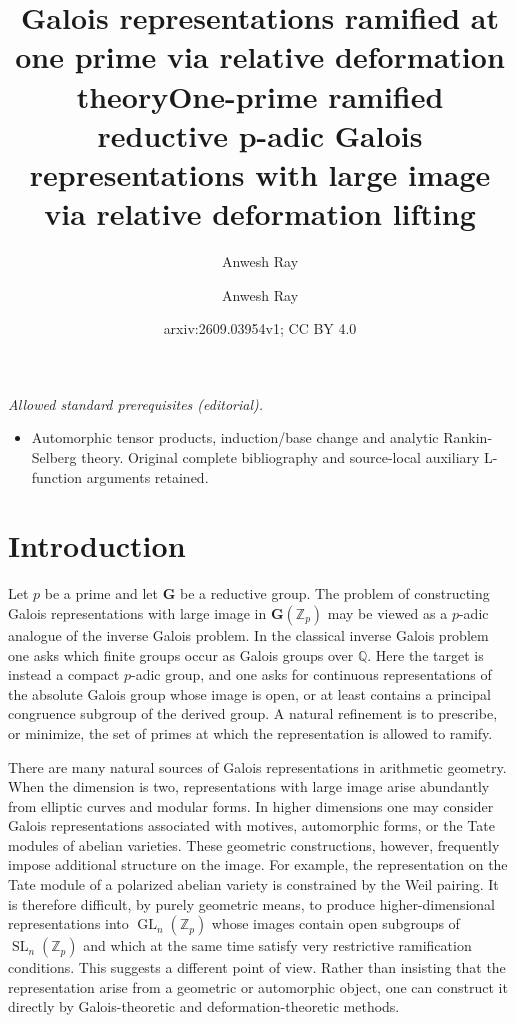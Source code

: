 \documentclass[11pt]{amsart}
\title[Galois representations ramified at one prime]{Galois representations ramified at one prime via relative deformation theory}
\author{Anwesh Ray}
\date{}
\title{One-prime ramified reductive p-adic Galois representations with large image via relative deformation lifting}
\author{Anwesh Ray}
\date{arxiv:2609.03954v1; CC BY 4.0}
\numberwithin{equation}{section}
\newcommand{\Q}{\mathbb Q}
\newcommand{\Zp}{\mathbb Z_p}
\newcommand{\GG}{\mathbf G}
\newcommand{\SL}{\operatorname{SL}}
\newcommand{\GL}{\operatorname{GL}}
\theoremstyle{definition}
\begin{document}
\maketitle
\noindent\textit{Allowed standard prerequisites (editorial).}\begin{itemize}
\item Automorphic tensor products, induction/base change and analytic Rankin-Selberg theory. Original complete bibliography and source-local auxiliary L-function arguments retained.
\end{itemize}\medskip
\section{Introduction}\label{sec:introduction}

\par Let $p$ be a prime and let $\GG$ be a reductive group. The problem of
constructing Galois representations with large image in
$\GG(\Zp)$ may be viewed as a $p$-adic analogue of the inverse Galois
problem. In the classical inverse Galois problem one asks which finite
groups occur as Galois groups over $\Q$. Here the target is instead a
compact $p$-adic group, and one asks for continuous representations of
the absolute Galois group whose image is open, or at least contains a
principal congruence subgroup of the derived group. A natural
refinement is to prescribe, or minimize, the set of primes at which the
representation is allowed to ramify.

\par There are many natural sources of Galois representations in arithmetic
geometry. When the dimension is two, representations with large image
arise abundantly from elliptic curves and modular forms. In higher
dimensions one may consider Galois representations associated with
motives, automorphic forms, or the Tate modules of abelian varieties.
These geometric constructions, however, frequently impose additional
structure on the image. For example, the representation on the Tate
module of a polarized abelian variety is constrained by the Weil
pairing. It is therefore difficult, by purely geometric means, to
produce higher-dimensional representations into $\GL_n(\Zp)$ whose
images contain open subgroups of $\SL_n(\Zp)$ and which at the same
time satisfy very restrictive ramification conditions. This suggests
a different point of view. Rather than insisting that the
representation arise from a geometric or automorphic object, one can
construct it directly by Galois-theoretic and deformation-theoretic
methods.
\end{document}

